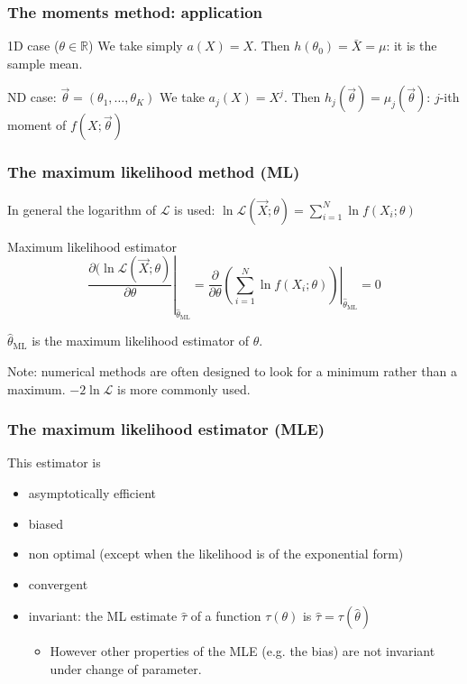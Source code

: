 \documentclass[9pt]{beamer}
\begin{document}
\begin{frame}
 \frametitle{The moments method: application}
 
 \begin{block}{1D case ($\theta \in \mathbb{R}$)}
  We take simply $a(X) = X$. Then $h(\theta_0) = \bar{X} = \mu$: it is the sample mean.
 \end{block}
 
 \begin{block}{ND case: $\vec{\theta} = (\theta_1,\dots,\theta_K)$}
  We take $a_j(X) = X^j$. Then $h_j(\vec{\theta}) = \mu_j(\vec{\theta})$: $j$-ith moment of $f(X;\vec{\theta})$
 \end{block}


\end{frame}

\begin{frame}
 \frametitle{The maximum likelihood method (ML)}
 
 In general the logarithm of $\mathcal{L}$ is used: $\ln \mathcal{L}\left(\vec{X};\theta\right) = \sum_{i=1}^N \ln f(X_i;\theta)$
 
 \begin{block}{Maximum likelihood estimator}
  $$\left. \frac{\partial (\ln \mathcal{L} \left(\vec{X};\theta\right)}{\partial \theta}\right|_{\hat{\theta}_\text{ML}} = \left.\frac{\partial}{\partial \theta} \left(  \sum_{i=1}^N \ln f(X_i;\theta) \right)\right|_{\hat{\theta}_\text{ML}} = 0$$
  
  $\hat{\theta}_\text{ML}$ is the maximum likelihood estimator of $\theta$.
 \end{block}

 Note: numerical methods are often designed to look for a minimum rather than a maximum. $-2 \ln \mathcal{L}$ is more commonly used.
\end{frame}

\begin{frame}
 \frametitle{The maximum likelihood estimator (MLE)}
 
 This estimator is 
 \begin{itemize}
  \item asymptotically efficient
  \item biased
  \item non optimal (except when the likelihood is of the exponential form)
  \item convergent
  \item invariant: the ML estimate $\hat{\tau}$ of a function $\tau(\theta)$ is $\hat{\tau} = \tau(\hat{\theta})$
  \begin{itemize}
   \item However other properties of the MLE (e.g. the bias) are not invariant under change of parameter.
  \end{itemize}

 \end{itemize}

\end{frame}
\end{document}
